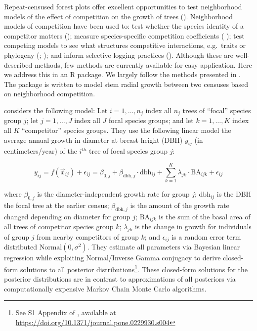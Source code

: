 \documentclass[12pt]{article}
\begin{document}
Repeat-censused forest plots offer excellent opportunities to test
neighborhood models of the effect of competition on the growth of trees
(\citet{canham_neighborhood_2004}). Neighborhood models of competition
have been used to: test whether the species identity of a competitor
matters (\citet{uriarte_spatially_2004}); measure species-specific
competition coefficients (\citet{das_effect_2012}
\citet{tatsumi_estimating_2016}); test competing models to see what
structures competitive interactions, e.g.~traits or phylogeny
(\citet{allen_permutation_2020}; \citet{uriarte_trait_2010}); and inform
selective logging practices (\citet{canham_neighborhood_2006}). Although
these are well-described methods, few methods are currently available
for easy application. Here we address this in an R package. We largely
follow the methods presented in \citet{allen_permutation_2020}. The
package is written to model stem radial growth between two censuses
based on neighborhood competition.

\citet{allen_permutation_2020} considers the following model: Let
\(i = 1, \ldots, n_j\) index all \(n_j\) trees of ``focal'' species
group \(j\); let \(j = 1, \ldots, J\) index all \(J\) focal species
groups; and let \(k = 1, \ldots, K\) index all \(K\) ``competitor''
species groups. They use the following linear model the average annual
growth in diameter at breast height (DBH) \(y_{ij}\) (in
centimeters/year) of the \(i^{th}\) tree of focal species group \(j\):

\begin{equation}
\label{eq:model}
y_{ij} = f(\vec{x}_{ij}) + \epsilon_{ij} = \beta_{0,j} + \beta_{\text{dbh},j} \cdot \text{dbh}_{ij} + \sum_{k=1}^{K} \lambda_{jk} \cdot \text{BA}_{ijk} + \epsilon_{ij}
\end{equation}

where \(\beta_{0,j}\) is the diameter-independent growth rate for group
\(j\); \(\text{dbh}_{ij}\) is the DBH the focal tree at the earlier
census; \(\beta_{\text{dbh},j}\) is the amount of the growth rate
changed depending on diameter for group \(j\); \(\text{BA}_{ijk}\) is
the sum of the basal area of all trees of competitor species group
\(k\); \(\lambda_{jk}\) is the change in growth for individuals of group
\(j\) from nearby competitors of group \(k\); and \(\epsilon_{ij}\) is a
random error term distributed \(\text{Normal}(0, \sigma^2)\). They
estimate all parameters via Bayesian linear regression while exploiting
Normal/Inverse Gamma conjugacy to derive closed-form solutions to all
posterior distributions\footnote{See S1 Appendix of
  \citet{allen_permutation_2020}, available at
  \url{https://doi.org/10.1371/journal.pone.0229930.s004}}. These
closed-form solutions for the posterior distributions are in contrast to
approximations of all posteriors via computationally expensive Markov
Chain Monte Carlo algorithms.
\end{document}
